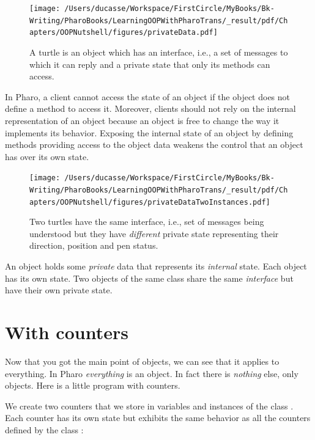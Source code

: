 \documentclass[10pt,twoside,english]{_support/latex/sbabook/sbabook}
\begin{document}
\begin{figure}

\begin{center}
\texttt{[image: /Users/ducasse/Workspace/FirstCircle/MyBooks/Bk-Writing/PharoBooks/LearningOOPWithPharoTrans/\_result/pdf/Chapters/OOPNutshell/figures/privateData.pdf]}\caption{A turtle is an object which has an interface, i.e., a set of messages to which it can reply and a private state that only its methods can access.\label{fig:objectOne}}\end{center}
\end{figure}


In Pharo, a client cannot access the state of an object if the object does not define a method to access it.  Moreover, clients should not  rely on the internal representation of an object because an object is free to change the way it  implements its behavior. Exposing the internal state of an object by defining methods providing access to the object data weakens the control that an object has over its own state.


\begin{figure}

\begin{center}
\texttt{[image: /Users/ducasse/Workspace/FirstCircle/MyBooks/Bk-Writing/PharoBooks/LearningOOPWithPharoTrans/\_result/pdf/Chapters/OOPNutshell/figures/privateDataTwoInstances.pdf]}\caption{Two turtles have the same interface, i.e., set of messages  being understood but they have \textit{different} private state representing their  direction, position and pen status.\label{fig:twoInstances}}\end{center}
\end{figure}


\begin{important}
An object holds some \textit{private} data that represents its \textit{internal} state. Each object has its own state. Two objects of the same class share the same \textit{interface} but have their own private state.
\end{important}
\section{With counters}
Now that you got the main point of objects, we can see that it applies to everything. In Pharo \textit{everything} is an object. In fact there is \textit{nothing} else, only objects. Here is a little program with counters. 

We create two counters that we store in variables  and  instances of the class . Each counter has its own state but exhibits the same behavior as all the counters defined by the class : 
\end{document}
